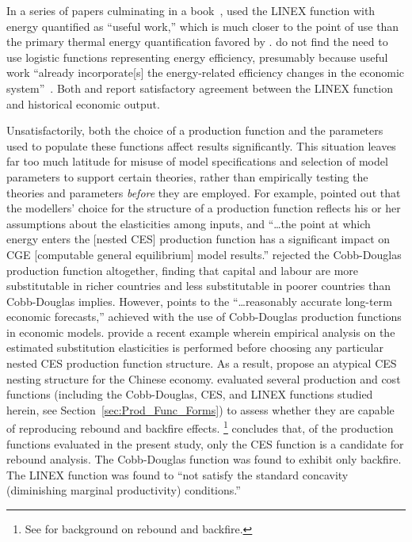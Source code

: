 \documentclass[preprint,authoryear,12pt]{elsarticle}\usepackage[]{graphicx}\usepackage[]{color}
\begin{document}
In a series of papers culminating in a book~\citep{Ayres:2010ug},
\citeauthor{Ayres:2010ug} used the LINEX function with energy quantified as ``useful work,''
which is much closer to the point of use than 
the primary thermal energy quantification favored by \citeauthor{Kummel:1980wx}.
\citeauthor{Ayres:2010ug} do not find the need to use logistic functions representing energy efficiency,
presumably because useful work ``already incorporate[s] the energy-related efficiency changes 
in the economic system''~\citep[p.~35]{Kummel:2013aa}.
Both \citeauthor{Kummel:1980wx} and \citeauthor{Ayres:2010ug}
report satisfactory agreement between the LINEX function and historical economic output.

Unsatisfactorily, both the choice of a production function 
and the parameters used to populate these functions 
affect results significantly.
This situation leaves far too much latitude 
for misuse of model specifications 
and selection of model parameters 
to support certain theories, rather than empirically testing the theories
and parameters \emph{before} they are employed.  
For example, \citet{Lecca:2011kr} pointed out that 
the modellers' choice for the structure of a production function 
reflects his or her assumptions about
the elasticities among inputs, and 
``\dots the point at which energy enters the [nested CES] production function 
has a significant impact on CGE [computable general equilibrium] model results.''
\citet{Duffy:2000ty} rejected the Cobb-Douglas production function altogether, 
finding that capital and labour are more substitutable 
in richer countries and less substitutable in poorer countries 
than Cobb-Douglas implies.  
However, \citet{Miller:2008vd} points to the 
``\dots reasonably accurate long-term economic forecasts,'' 
achieved with the use of Cobb-Douglas production functions in economic models.  
\citet{Shen:2013vp} provide a recent example 
wherein empirical analysis on the estimated substitution elasticities 
is performed before choosing any particular 
nested CES production function structure. 
As a result, \citeauthor{Shen:2013vp} propose an atypical CES nesting structure 
for the Chinese economy.
\citet{Saunders:2008aa} evaluated several production and cost functions
(including the Cobb-Douglas, CES, and LINEX functions studied herein, 
see Section~\ref{sec:Prod_Func_Forms})
to assess whether they are capable of reproducing 
rebound and backfire effects.%
  \footnote{
  See \citet{Sorrell:2007um} for background on rebound and backfire.
  }
\citeauthor{Saunders:2008aa} concludes that,
of the production functions evaluated in the present study,
only the CES function is a candidate for 
rebound analysis.
The Cobb-Douglas function was found to exhibit only backfire.
The LINEX function was found to 
``not satisfy the standard concavity (diminishing marginal productivity) 
conditions.''~\citet[p.~2195]{Saunders:2008aa}
\end{document}
